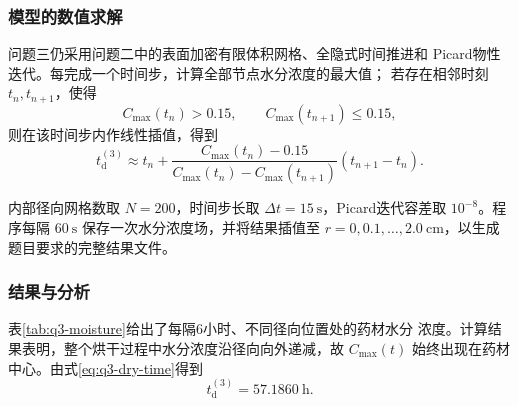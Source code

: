 \documentclass[12pt,a4paper]{article}
\renewcommand{\boxed}[1]{#1}
\begin{document}
\subsubsection{模型的数值求解}

问题三仍采用问题二中的表面加密有限体积网格、全隐式时间推进和
Picard物性迭代。每完成一个时间步，计算全部节点水分浓度的最大值；
若存在相邻时刻 $t_n,t_{n+1}$，使得
\begin{equation}
C_{\max}(t_n)>0.15,\qquad
C_{\max}(t_{n+1})\leq0.15,
\end{equation}
则在该时间步内作线性插值，得到
\begin{equation}
t_{\mathrm d}^{(3)}
\approx t_n+
\frac{C_{\max}(t_n)-0.15}
{C_{\max}(t_n)-C_{\max}(t_{n+1})}
(t_{n+1}-t_n).
\label{eq:q3-time-interpolation}
\end{equation}

内部径向网格数取 $N=200$，时间步长取
$\Delta t=15\ \mathrm{s}$，Picard迭代容差取 $10^{-8}$。程序每隔
$60\ \mathrm{s}$ 保存一次水分浓度场，并将结果插值至
$r=0,0.1,\ldots,2.0\ \mathrm{cm}$，以生成题目要求的完整结果文件。

\subsubsection{结果与分析}

表\ref{tab:q3-moisture}给出了每隔6小时、不同径向位置处的药材水分
浓度。计算结果表明，整个烘干过程中水分浓度沿径向向外递减，故
$C_{\max}(t)$ 始终出现在药材中心。由式\eqref{eq:q3-dry-time}得到
\begin{equation}
\boxed{t_{\mathrm d}^{(3)}=57.1860\ \mathrm{h}}.
\label{eq:q3-result-time}
\end{equation}
\end{document}
